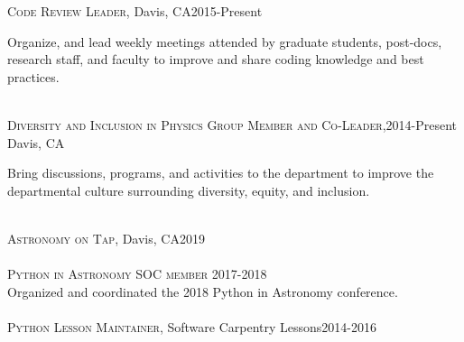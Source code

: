 \documentclass[10pt]{cv}
\begin{document}
\begin{llist}
\textsc{Code Review Leader}, Davis, CA\hfill 2015-Present\\
\begin{minipage}[l]{0.7\textwidth}\vspace{0.15cm}
Organize, and lead weekly meetings attended by graduate students, post-docs, research staff, and faculty to improve and share coding knowledge and best practices.\\
\end{minipage}\vspace{0.15cm}
\\
\textsc{Diversity and Inclusion in Physics Group Member and Co-Leader,}\hfill 2014-Present\\
Davis, CA \\
\begin{minipage}[l]{0.7\textwidth}\vspace{0.15cm}
Bring discussions, programs, and activities to the department to improve the departmental culture surrounding diversity, equity, and inclusion.\\
\end{minipage}\vspace{0.15cm}
\\
\textsc{Astronomy on Tap}, Davis, CA\hfill 2019\\
%
\\
\textsc{Python in Astronomy SOC member} \hfill 2017-2018\\
Organized and coordinated the 2018 Python in Astronomy conference.\\
\\
\textsc{Python Lesson Maintainer}, Software Carpentry Lessons\hfill 2014-2016\\
\begin{minipage}[l]{0.7\textwidth}\vspace{0.15cm}

\end{minipage}
\end{llist}
\end{document}
